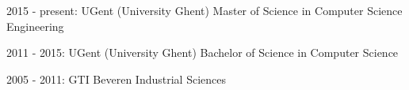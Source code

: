 


\begin{cventries}


\cventry
{2015 - present: UGent (University Ghent)} %
{Master of Science in Computer Science Engineering} %
{}
{}
{ %
}

\cventry
{2011 - 2015: UGent (University Ghent)} %
{Bachelor of Science in Computer Science} %
{}
{}
{ %
}

\cventry
{2005 - 2011: GTI Beveren} %
{Industrial Sciences} %
{}
{}
{ %
}


\end{cventries}